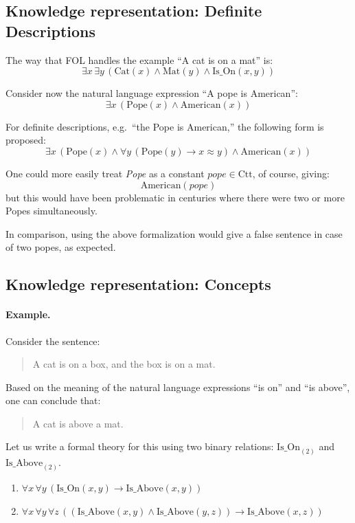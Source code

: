 \documentclass[11pt]{article}
\begin{document}
    \subsection{Knowledge representation: Definite Descriptions}
    \label{subsec:knowledge-representation:-definite-descriptions}

    The way that \ac{FOL} handles the example ``A cat is on a mat'' is:
    \[
    \exists x\, \exists y\, (\text{Cat}(x) \wedge \text{Mat}(y) \wedge \text{Is\_On}(x, y))
    \]

    Consider now the natural language expression ``A pope is American'':
    \[
    \exists x\, (\text{Pope}(x) \wedge \text{American}(x))
    \]

    For definite descriptions, e.g.\ ``the Pope is American,'' the following form is proposed:
    \[
    \exists x\, (\text{Pope}(x) \wedge \forall y\, (\text{Pope}(y) \rightarrow x \approx y) \wedge \text{American}(x))
    \]

    One could more easily treat \textit{Pope} as a constant $pope \in \text{Ctt}$, of course, giving:
    \[
    \text{American}(pope)
    \]
    but this would have been problematic in centuries where there were two or more Popes simultaneously.

    In comparison, using the above formalization would give a false sentence in case of two popes, as expected.


    \subsection{Knowledge representation: Concepts}\label{subsec:knowledge-representation:-concepts}

    \paragraph{Example.}
    Consider the sentence:
    \begin{quote}
    A cat is on a box, and the box is on a mat.
    \end{quote}
    Based on the meaning of the natural language expressions ``is on'' and ``is above'', one can conclude that:
    \begin{quote}
    A cat is above a mat.
    \end{quote}

    Let us write a formal theory for this using two binary relations: $\text{Is\_On}_{(2)}$ and $\text{Is\_Above}_{(2)}$.

    \begin{enumerate}
        \item $\forall x\, \forall y\, (\text{Is\_On}(x, y) \rightarrow \text{Is\_Above}(x, y))$
        \item $\forall x\, \forall y\, \forall z\, ((\text{Is\_Above}(x, y) \wedge \text{Is\_Above}(y, z)) \rightarrow \text{Is\_Above}(x, z))$
    \end{enumerate}
\end{document}

